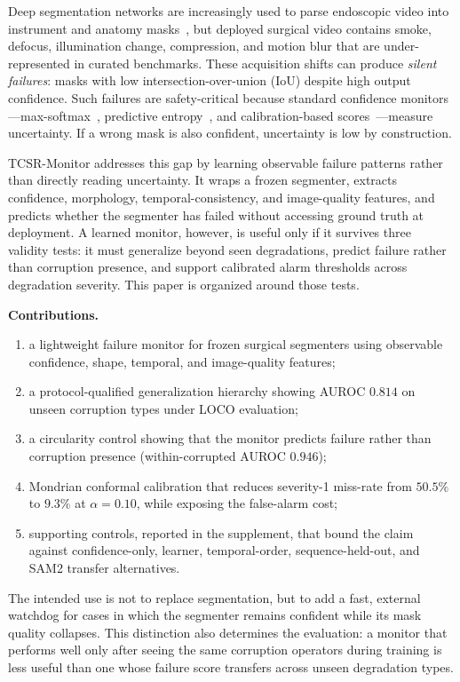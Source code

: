 \documentclass[runningheads]{llncs}
\newcommand{\monitor}{TCSR-Monitor}
\begin{document}
Deep segmentation networks are increasingly used to parse endoscopic video
into instrument and anatomy masks~\cite{ref:shvets,ref:allan}, but deployed
surgical video contains smoke, defocus, illumination change, compression, and
motion blur that are under-represented in curated benchmarks. These acquisition
shifts can produce \emph{silent failures}: masks with low intersection-over-union
(IoU) despite high output confidence. Such failures are safety-critical because
standard confidence monitors---max-softmax~\cite{ref:hendrycks}, predictive
entropy~\cite{ref:malinin}, and calibration-based scores~\cite{ref:guo}---measure
uncertainty. If a wrong mask is also confident, uncertainty is low by
construction.

\monitor{} addresses this gap by learning observable failure patterns rather
than directly reading uncertainty. It wraps a frozen segmenter, extracts
confidence, morphology, temporal-consistency, and image-quality features, and
predicts whether the segmenter has failed without accessing ground truth at
deployment. A learned monitor, however, is useful only if it survives three
validity tests: it must generalize beyond seen degradations, predict failure
rather than corruption presence, and support calibrated alarm thresholds across
degradation severity. This paper is organized around those tests.

\noindent\textbf{Contributions.}
\begin{enumerate}
\item a lightweight failure monitor for frozen surgical segmenters using
observable confidence, shape, temporal, and image-quality features;
\item a protocol-qualified generalization hierarchy showing AUROC $0.814$ on
unseen corruption types under LOCO evaluation;
\item a circularity control showing that the monitor predicts failure rather
than corruption presence (within-corrupted AUROC $0.946$);
\item Mondrian conformal calibration that reduces severity-1 miss-rate from
$50.5\%$ to $9.3\%$ at $\alpha=0.10$, while exposing the false-alarm cost;
\item supporting controls, reported in the supplement, that bound the claim
against confidence-only, learner, temporal-order, sequence-held-out, and SAM2
transfer alternatives.
\end{enumerate}

The intended use is not to replace segmentation, but to add a fast, external
watchdog for cases in which the segmenter remains confident while its mask
quality collapses. This distinction also determines the evaluation: a monitor
that performs well only after seeing the same corruption operators during
training is less useful than one whose failure score transfers across unseen
degradation types.
\end{document}
